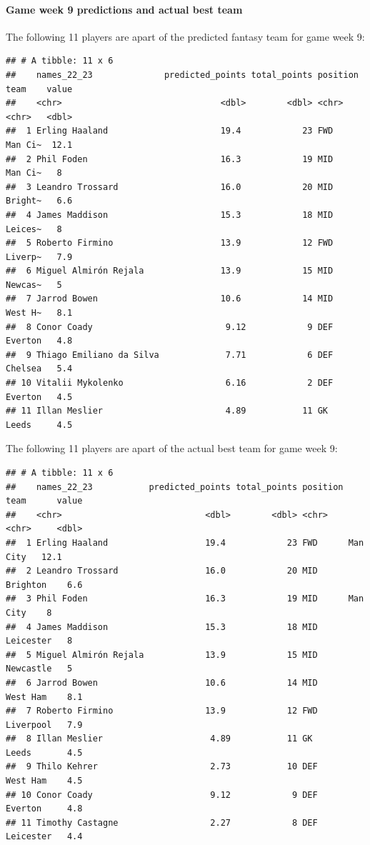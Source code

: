 \documentclass[11pt,preprint, authoryear]{elsarticle}
\numberwithin{equation}{section}
\numberwithin{figure}{section}
\numberwithin{table}{section}
\begin{document}
\hypertarget{game-week-9-predictions-and-actual-best-team}{%
\paragraph{Game week 9 predictions and actual best
team}\label{game-week-9-predictions-and-actual-best-team}}

The following 11 players are apart of the predicted fantasy team for
game week 9:

\begin{verbatim}
## # A tibble: 11 x 6
##    names_22_23              predicted_points total_points position team    value
##    <chr>                               <dbl>        <dbl> <chr>    <chr>   <dbl>
##  1 Erling Haaland                      19.4            23 FWD      Man Ci~  12.1
##  2 Phil Foden                          16.3            19 MID      Man Ci~   8  
##  3 Leandro Trossard                    16.0            20 MID      Bright~   6.6
##  4 James Maddison                      15.3            18 MID      Leices~   8  
##  5 Roberto Firmino                     13.9            12 FWD      Liverp~   7.9
##  6 Miguel Almirón Rejala               13.9            15 MID      Newcas~   5  
##  7 Jarrod Bowen                        10.6            14 MID      West H~   8.1
##  8 Conor Coady                          9.12            9 DEF      Everton   4.8
##  9 Thiago Emiliano da Silva             7.71            6 DEF      Chelsea   5.4
## 10 Vitalii Mykolenko                    6.16            2 DEF      Everton   4.5
## 11 Illan Meslier                        4.89           11 GK       Leeds     4.5
\end{verbatim}

The following 11 players are apart of the actual best team for game week
9:

\begin{verbatim}
## # A tibble: 11 x 6
##    names_22_23           predicted_points total_points position team      value
##    <chr>                            <dbl>        <dbl> <chr>    <chr>     <dbl>
##  1 Erling Haaland                   19.4            23 FWD      Man City   12.1
##  2 Leandro Trossard                 16.0            20 MID      Brighton    6.6
##  3 Phil Foden                       16.3            19 MID      Man City    8  
##  4 James Maddison                   15.3            18 MID      Leicester   8  
##  5 Miguel Almirón Rejala            13.9            15 MID      Newcastle   5  
##  6 Jarrod Bowen                     10.6            14 MID      West Ham    8.1
##  7 Roberto Firmino                  13.9            12 FWD      Liverpool   7.9
##  8 Illan Meslier                     4.89           11 GK       Leeds       4.5
##  9 Thilo Kehrer                      2.73           10 DEF      West Ham    4.5
## 10 Conor Coady                       9.12            9 DEF      Everton     4.8
## 11 Timothy Castagne                  2.27            8 DEF      Leicester   4.4
\end{verbatim}
\end{document}
